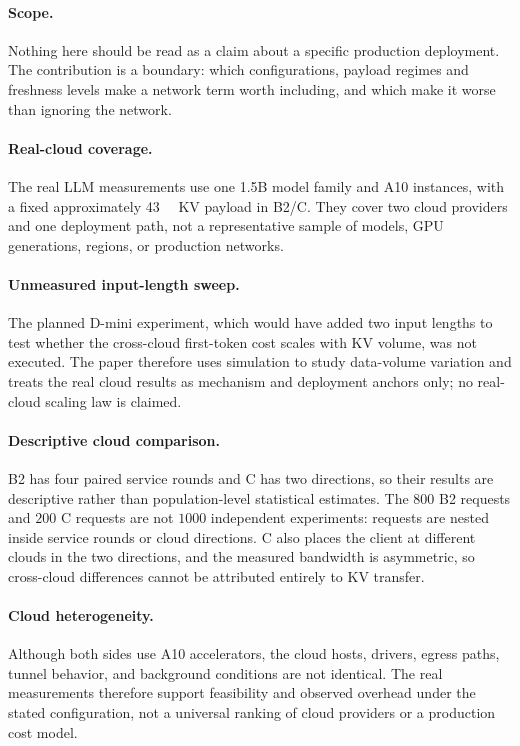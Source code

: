 \paragraph{Scope.} Nothing here should be read as a claim about a specific production
deployment. The contribution is a boundary: which configurations, payload regimes and freshness
levels make a network term worth including, and which make it worse than ignoring the network.

\paragraph{Real-cloud coverage.} The real LLM measurements use one 1.5B model family and A10
instances, with a fixed approximately \SI{43}{\mega\byte} KV payload in B2/C. They cover two
cloud providers and one deployment path, not a representative sample of models, GPU generations,
regions, or production networks.

\paragraph{Unmeasured input-length sweep.} The planned D-mini experiment, which would have added
two input lengths to test whether the cross-cloud first-token cost scales with KV volume, was not
executed. The paper therefore uses simulation to study data-volume variation and treats the real
cloud results as mechanism and deployment anchors only; no real-cloud scaling law is claimed.

\paragraph{Descriptive cloud comparison.} B2 has four paired service rounds and C has two
directions, so their results are descriptive rather than population-level statistical estimates.
The $800$ B2 requests and $200$ C requests are not $1000$ independent experiments: requests are
nested inside service rounds or cloud directions. C also places the client at different clouds in
the two directions, and the measured bandwidth is asymmetric, so cross-cloud differences cannot
be attributed entirely to KV transfer.

\paragraph{Cloud heterogeneity.} Although both sides use A10 accelerators, the cloud hosts,
drivers, egress paths, tunnel behavior, and background conditions are not identical. The real
measurements therefore support feasibility and observed overhead under the stated configuration,
not a universal ranking of cloud providers or a production cost model.
